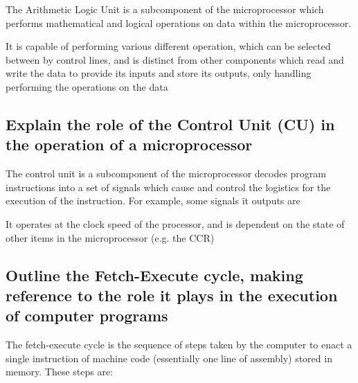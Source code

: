 \documentclass{article}
\begin{document}
The Arithmetic Logic Unit is a subcomponent of the microprocessor which
performs mathematical and logical operations on data within the
microprocessor.

It is capable of performing various different operation, which can be
selected between by control lines, and is distinct from other components
which read and write the data to provide its inputs and store its
outputs, only handling performing the operations on the data



\subsection{Explain the role of the Control Unit (CU) in the operation
of a microprocessor}

The control unit is a subcomponent of the microprocessor decodes program
instructions into a set of signals which cause and control the logistics
for the execution of the instruction. For example, some signals it
outputs are

It operates at the clock speed of the processor, and is dependent on the
state of other items in the microprocessor (e.g. the CCR)



\subsection{Outline the Fetch-Execute cycle, making reference to the
role it plays in the execution of computer programs}

The fetch-execute cycle is the sequence of steps taken by the computer
to enact a single instruction of machine code (essentially one line of
assembly) stored in memory. These steps are:
\end{document}
